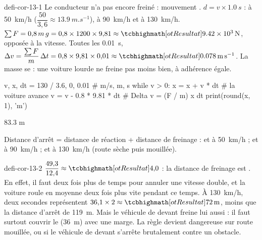 \begin{blocEdition}{defi-cor-13-1}
Le conducteur n'a pas encore freiné : mouvement . $d=v\times\qty{1,0}{s}$ :  à \qty{50}{km/h}
($\dfrac{50}{3{,}6}\approx\qty{13,9}{m.s^{-1}}$),  à \qty{90}{km/h} et  à \qty{130}{km/h}.
$\sum F=0{,}8\,m\,g=0{,}8\times1200\times9{,}81\approx\res{\qty{9,42e3}{N}}$, opposée à la vitesse. Toutes les \qty{0,01}{s},
$\Delta v=\dfrac{\sum F}{m}\,\Delta t=0{,}8\times9{,}81\times0{,}01\approx\res{\qty{0,078}{m.s^{-1}}}$. La masse se  : une voiture lourde ne freine
pas moins bien, à adhérence égale.
\begin{python}
v, x, dt = 130 / 3.6, 0, 0.01      # m/s, m, s
while v > 0:
    x = x + v * dt                 # la voiture avance
    v = v - 0.8 * 9.81 * dt        # Delta v = (F / m) x dt
print(round(x, 1), 'm')
\end{python}
\begin{console}
83.3 m
\end{console}
Distance d'arrêt = distance de réaction + distance de freinage :  et  à \qty{50}{km/h} ;  et 
à \qty{90}{km/h} ;  et  à \qty{130}{km/h} (route sèche puis mouillée).
\end{blocEdition}

\begin{blocEdition}{defi-cor-13-2}
\label{figedition-defi-cor-13-2-1}
$\dfrac{49{,}3}{12{,}4}\approx\res{4{,}0}$ : la distance de freinage est . En effet, il faut deux fois plus de temps pour
annuler une vitesse double, et la voiture roule en moyenne deux fois plus vite pendant ce temps.
À \qty{130}{km/h}, deux secondes représentent $36{,}1\times2\approx\res{\qty{72}{m}}$, moins que la distance d'arrêt de \qty{119}{m}. Mais le véhicule de
devant freine lui aussi : il faut surtout couvrir le  (\qty{36}{m}) avec une marge. La règle devient dangereuse
sur route mouillée, ou si le véhicule de devant s'arrête brutalement contre un obstacle.
\end{blocEdition}

